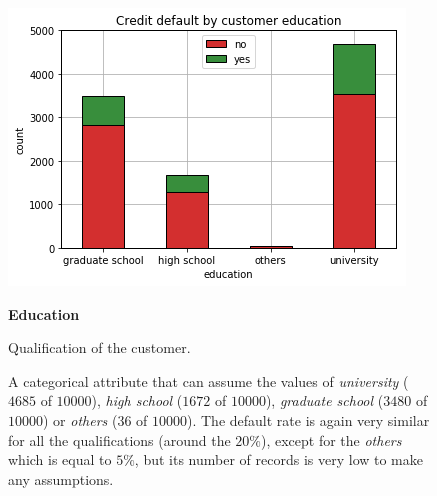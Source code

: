 \begin{figure}[h]
  \begin{minipage}[h]{.45\textwidth}
    \includegraphics[width=.95\textwidth]{img/ch2/education}
  \end{minipage}
  \begin{minipage}[h]{.50\textwidth}
        {\Large \textbf{Education}}
        
        Qualification of the customer.
        
        A categorical attribute that can assume the values of 
        \textit{university} ($4685$ of $10000$),
        \textit{high school} ($1672$ of $10000$),
        \textit{graduate school} ($3480$ of $10000$) or
        \textit{others} ($36$ of $10000$).
        The default rate is again very similar for all the qualifications (around the $20\%$), except for the \textit{others} which is equal to $5\%$, but its number of records is very low to make any assumptions.
  \end{minipage}
\end{figure}

